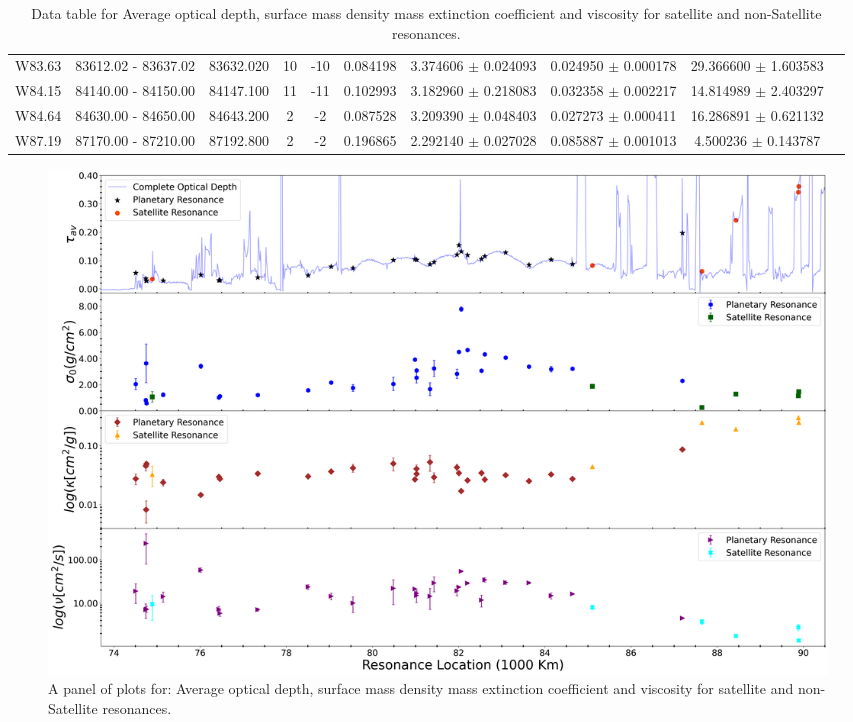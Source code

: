 \documentclass{article}
\begin{document}
\begin{table}[h]
{\begin{tabular}{|c|c|c|c|c|c|c|c|c|c|}
W83.63 & 83612.02 - 83637.02 & 83632.020 & 10 & -10 & 0.084198 & 3.374606 $\pm$ 0.024093 &  0.024950 $\pm$ 0.000178 & 29.366600 $\pm$ 1.603583 \\
         
W84.15 & 84140.00 - 84150.00 & 84147.100 & 11 & -11 & 0.102993 & 3.182960 $\pm$ 0.218083 & 0.032358 $\pm$ 0.002217 & 14.814989 $\pm$ 2.403297 \\
         
W84.64 & 84630.00 - 84650.00 & 84643.200 & 2 & -2 & 0.087528 & 3.209390 $\pm$ 0.048403 & 0.027273 $\pm$ 0.000411 & 16.286891 $\pm$ 0.621132 \\
         
W87.19 & 87170.00 - 87210.00 & 87192.800 & 2 & -2 & 0.196865 & 2.292140 $\pm$ 0.027028 & 0.085887 $\pm$ 0.001013 & 4.500236 $\pm$ 0.143787 \\

\hline
\end{tabular}
\vspace{-1.5cm}
}
\caption{Data table for Average optical depth, surface mass density mass extinction coefficient and viscosity for satellite and non-Satellite resonances.}
\end{table}

\begin{figure}[h]
    \centering
    \includegraphics[width=0.9\linewidth]{tau_sigma_kapp_nu_Updated.png}
    \caption{A panel of plots for: Average optical depth, surface mass density mass extinction coefficient and viscosity for satellite and non-Satellite resonances.}
    \label{fig:enter-label}
\end{figure}

\end{document}

